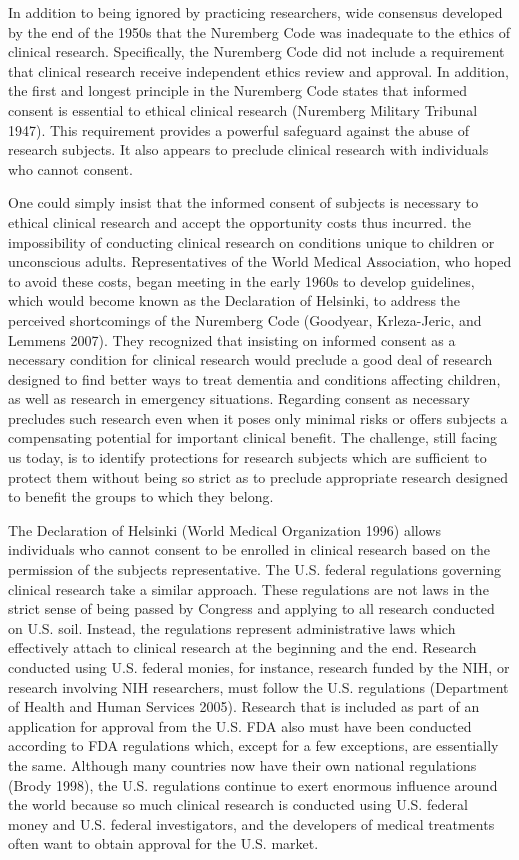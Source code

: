 \documentclass[12p]{article}
\begin{document}
In addition to being ignored by practicing researchers, wide consensus developed by the end of the 1950s that the Nuremberg Code was inadequate to the ethics of clinical research. Specifically, the Nuremberg Code did not include a requirement that clinical research receive independent ethics review and approval. In addition, the first and longest principle in the Nuremberg Code states that informed consent is essential to ethical clinical research (Nuremberg Military Tribunal 1947). This requirement provides a powerful safeguard against the abuse of research subjects. It also appears to preclude clinical research with individuals who cannot consent.

One could simply insist that the informed consent of subjects is necessary to ethical clinical research and accept the opportunity costs thus incurred. the impossibility of conducting clinical research on conditions unique to children or unconscious adults. Representatives of the World Medical Association, who hoped to avoid these costs, began meeting in the early 1960s to develop guidelines, which would become known as the Declaration of Helsinki, to address the perceived shortcomings of the Nuremberg Code (Goodyear, Krleza-Jeric, and Lemmens 2007). They recognized that insisting on informed consent as a necessary condition for clinical research would preclude a good deal of research designed to find better ways to treat dementia and conditions affecting children, as well as research in emergency situations. Regarding consent as necessary precludes such research even when it poses only minimal risks or offers subjects a compensating potential for important clinical benefit. The challenge, still facing us today, is to identify protections for research subjects which are sufficient to protect them without being so strict as to preclude appropriate research designed to benefit the groups to which they belong.

The Declaration of Helsinki (World Medical Organization 1996) allows individuals who cannot consent to be enrolled in clinical research based on the permission of the subjects representative. The U.S. federal regulations governing clinical research take a similar approach. These regulations are not laws in the strict sense of being passed by Congress and applying to all research conducted on U.S. soil. Instead, the regulations represent administrative laws which effectively attach to clinical research at the beginning and the end. Research conducted using U.S. federal monies, for instance, research funded by the NIH, or research involving NIH researchers, must follow the U.S. regulations (Department of Health and Human Services 2005). Research that is included as part of an application for approval from the U.S. FDA also must have been conducted according to FDA regulations which, except for a few exceptions, are essentially the same. Although many countries now have their own national regulations (Brody 1998), the U.S. regulations continue to exert enormous influence around the world because so much clinical research is conducted using U.S. federal money and U.S. federal investigators, and the developers of medical treatments often want to obtain approval for the U.S. market.
\end{document}
